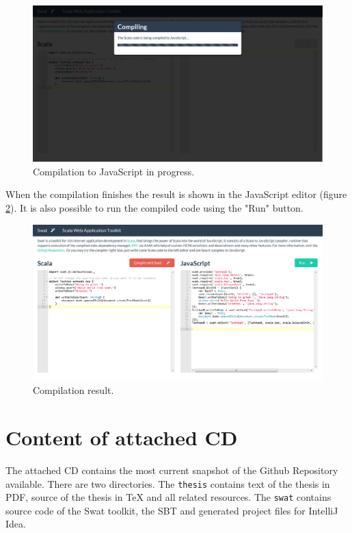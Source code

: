 \documentclass[12pt,a4paper]{report}
\begin{document}
\begin{figure}[ht]
  \centering
	\includegraphics[width=\linewidth,height=\textheight,keepaspectratio]{img/Swatting.png}
	\caption{Compilation to JavaScript in progress.}
	\label{Swatting}
\end{figure}

When the compilation finishes the result is shown in the JavaScript editor (figure \ref{Swatted}). It is also possible to run the compiled code using the "Run" button.

\begin{figure}[ht]
  \centering
	\includegraphics[width=\linewidth,height=\textheight,keepaspectratio]{img/Swatted.png}
	\caption{Compilation result.}
	\label{Swatted}
\end{figure}



\chapter{Content of attached CD}

The attached CD contains the most current snapshot of the Github Repository available. There are two directories. The \texttt{thesis} contains text of the thesis in PDF, source of the thesis in TeX and all related resources. The \texttt{swat} contains source code of the Swat toolkit, the SBT and generated project files for IntelliJ Idea.
\end{document}

